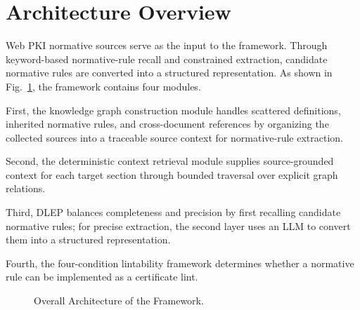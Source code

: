 \section{Architecture Overview}
\label{sec:methodology}
\label{sec:method-overview}

Web PKI normative sources serve as the input to the framework. Through keyword-based normative-rule recall and constrained extraction, candidate normative rules are converted into a structured representation. As shown in Fig.~\ref{fig:architecture}, the framework contains four modules.

First, the knowledge graph construction module handles scattered definitions, inherited normative rules, and cross-document references by organizing the collected sources into a traceable source context for normative-rule extraction.

Second, the deterministic context retrieval module supplies source-grounded context for each target section through bounded traversal over explicit graph relations.

Third, DLEP balances completeness and precision by first recalling candidate normative rules; for precise extraction, the second layer uses an LLM to convert them into a structured representation.

Fourth, the four-condition lintability framework determines whether a normative rule can be implemented as a certificate lint.

\begin{figure}[tb]
  \centering
  \caption{Overall Architecture of the Framework.}
  \label{fig:architecture}
\end{figure}
